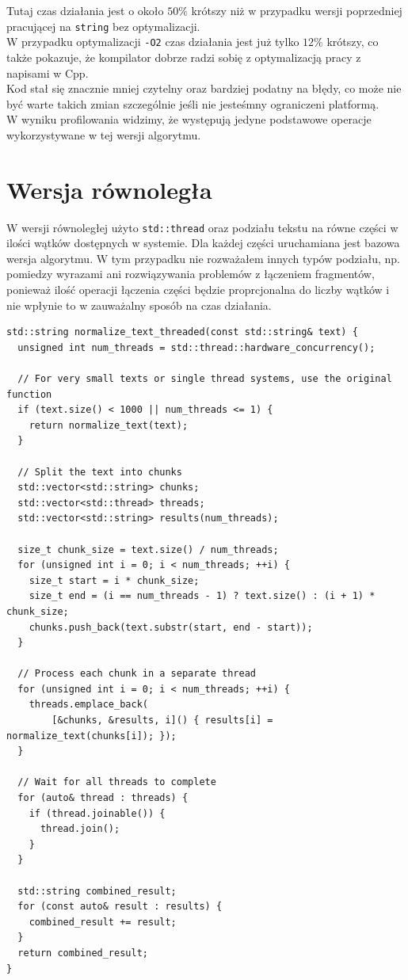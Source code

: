 \documentclass[12pt]{article}
\begin{document}
Tutaj czas działania jest o około $50\%$ krótszy niż w przypadku wersji poprzedniej
pracującej na \verb|string| bez optymalizacji. \\

W przypadku optymalizacji \verb|-O2| czas działania jest już tylko $12\%$ krótszy, 
co także pokazuje, że kompilator dobrze radzi sobię z optymalizacją pracy z napisami
w Cpp. \\

Kod stał się znacznie mniej czytelny oraz bardziej podatny na błędy, co może nie być 
warte takich zmian szczególnie jeśli nie jesteśmny ograniczeni platformą. \\

W wyniku profilowania widzimy, że występują jedyne podstawowe operacje wykorzystywane
w tej wersji algorytmu.






\section*{Wersja równoległa}
W wersji równoległej użyto \verb|std::thread| oraz podziału tekstu na równe części
w ilości wątków dostępnych w systemie. Dla każdej części uruchamiana jest bazowa
wersja algorytmu.
W tym przypadku nie rozważałem innych typów podziału, np. pomiedzy wyrazami ani 
rozwiązywania problemów z łączeniem fragmentów, ponieważ ilość operacji łączenia 
części będzie proprcjonalna do liczby wątków i nie wpłynie to w zauważalny sposób 
na czas działania. 

\begin{verbatim}
std::string normalize_text_threaded(const std::string& text) {
  unsigned int num_threads = std::thread::hardware_concurrency();

  // For very small texts or single thread systems, use the original function
  if (text.size() < 1000 || num_threads <= 1) {
    return normalize_text(text);
  }

  // Split the text into chunks
  std::vector<std::string> chunks;
  std::vector<std::thread> threads;
  std::vector<std::string> results(num_threads);

  size_t chunk_size = text.size() / num_threads;
  for (unsigned int i = 0; i < num_threads; ++i) {
    size_t start = i * chunk_size;
    size_t end = (i == num_threads - 1) ? text.size() : (i + 1) * chunk_size;
    chunks.push_back(text.substr(start, end - start));
  }

  // Process each chunk in a separate thread
  for (unsigned int i = 0; i < num_threads; ++i) {
    threads.emplace_back(
        [&chunks, &results, i]() { results[i] = normalize_text(chunks[i]); });
  }

  // Wait for all threads to complete
  for (auto& thread : threads) {
    if (thread.joinable()) {
      thread.join();
    }
  }

  std::string combined_result;
  for (const auto& result : results) {
    combined_result += result;
  }
  return combined_result;
}
\end{verbatim}
\end{document}
